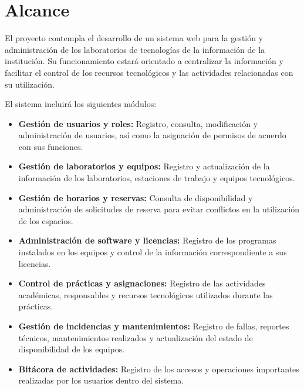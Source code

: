 \section{Alcance}

El proyecto contempla el desarrollo de un sistema web para la gestión y administración de los laboratorios de tecnologías de la información de la institución. Su funcionamiento estará orientado a centralizar la información y facilitar el control de los recursos tecnológicos y las actividades relacionadas con su utilización.

El sistema incluirá los siguientes módulos:

\begin{itemize}[leftmargin=*]

    \item \textbf{Gestión de usuarios y roles:}
    Registro, consulta, modificación y administración de usuarios, así como la asignación de permisos de acuerdo con sus funciones.

    \item \textbf{Gestión de laboratorios y equipos:}
    Registro y actualización de la información de los laboratorios, estaciones de trabajo y equipos tecnológicos.

    \item \textbf{Gestión de horarios y reservas:}
    Consulta de disponibilidad y administración de solicitudes de reserva para evitar conflictos en la utilización de los espacios.

    \item \textbf{Administración de software y licencias:}
    Registro de los programas instalados en los equipos y control de la información correspondiente a sus licencias.

    \item \textbf{Control de prácticas y asignaciones:}
    Registro de las actividades académicas, responsables y recursos tecnológicos utilizados durante las prácticas.

    \item \textbf{Gestión de incidencias y mantenimientos:}
    Registro de fallas, reportes técnicos, mantenimientos realizados y actualización del estado de disponibilidad de los equipos.

    \item \textbf{Bitácora de actividades:}
    Registro de los accesos y operaciones importantes realizadas por los usuarios dentro del sistema.

\end{itemize}


